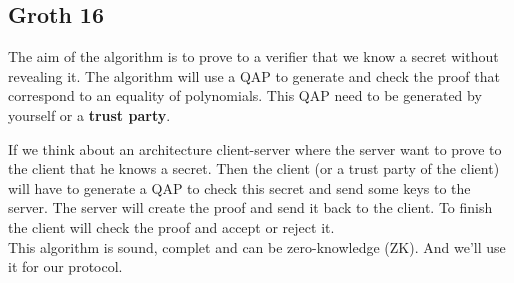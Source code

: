 \subsection{Groth 16}
\cite{On_the_Size_of_Pairing_based_Non_interactive_Arguments}
The aim of the algorithm is to prove to a verifier that we know a secret without revealing it.
The algorithm will use a QAP to generate and check the proof that correspond to an equality of polynomials. This QAP need to be generated by yourself or a \textbf{trust party}. 

If we think about an architecture client-server where the server want to prove to the client that he knows a secret. 
Then the client (or a trust party of the client) will have to generate a QAP to check this secret and send some keys to the server. 
The server will create the proof and send it back to the client. 
To finish the client will check the proof and accept or reject it.
\\This algorithm is sound, complet and can be zero-knowledge (ZK). And we'll use it for our protocol.